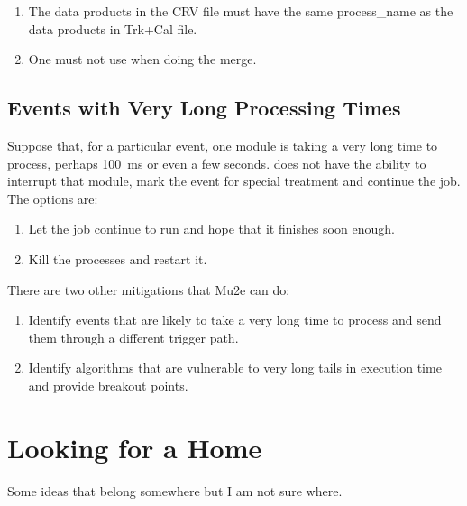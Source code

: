 \begin{enumerate}
  \item The data products in the CRV file must have the same process\_name as the data products in Trk+Cal file.
  \item One must not use  when doing the merge.
\end{enumerate}


\section{Events with Very Long Processing Times}

Suppose that, for a particular event, one module is taking a very long time to process,
perhaps 100~ms or even a few seconds.  \art does not have the ability to interrupt
that module, mark the event for special treatment and continue the job.  The options are:

\begin{enumerate}
  \item Let the job continue to run and hope that it finishes soon enough.
  \item Kill the processes and restart it.
\end{enumerate}

There are two other mitigations that Mu2e can do:
\begin{enumerate}
  \item Identify events that are likely to take a very long time to process and send them through a different trigger path.
  \item Identify algorithms that are vulnerable to very long tails in execution time and provide breakout points.
\end{enumerate}


\chapter{Looking for a Home}
\label{app:LookingForaHome}

Some ideas that belong somewhere but I am not sure where.



\clearpage
{}
{}
\printbibliography


